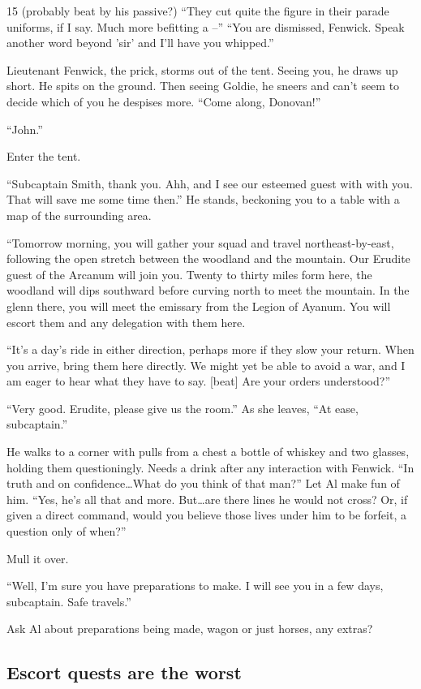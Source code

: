\begin{multicols}{2}
15 (probably beat by his passive?)
``They cut quite the figure in their parade uniforms, if I say.
  Much more befitting a --''
``You are dismissed, Fenwick.
  Speak another word beyond 'sir' and I'll have you whipped.''

Lieutenant Fenwick, the prick, storms out of the tent.
Seeing you, he draws up short.
He spits on the ground.
Then seeing Goldie, he sneers and can't seem to decide which of you he despises more.
``Come along, Donovan!''

``John.''

Enter the tent.

``Subcaptain Smith, thank you.
  Ahh, and I see our esteemed guest with with you.
  That will save me some time then.''
He stands, beckoning you to a table with a map of the surrounding area.

``Tomorrow morning, you will gather your squad and travel northeast-by-east,
    following the open stretch between the woodland and the mountain.
  Our Erudite guest of the Arcanum will join you.
  Twenty to thirty miles form here, the woodland will dips southward before curving north to meet
    the mountain.
  In the glenn there, you will meet the emissary from the Legion of Ayanum.
  You will escort them and any delegation with them here.

``It's a day's ride in either direction, perhaps more if they slow your return.
  When you arrive, bring them here directly.
  We might yet be able to avoid a war, and I am eager to hear what they have to say.
  [beat]
  Are your orders understood?''

``Very good.
  Erudite, please give us the room.''
As she leaves, ``At ease, subcaptain.''

He walks to a corner with pulls from a chest a bottle of whiskey and two glasses, holding them
  questioningly.
Needs a drink after any interaction with Fenwick.
``In truth and on confidence\ldots What do you think of that man?''
Let Al make fun of him.
``Yes, he's all that and more.
  But\ldots are there lines he would not cross?
  Or, if given a direct command, would you believe those lives under him to be forfeit, a question
    only of when?''

Mull it over.

``Well, I'm sure you have preparations to make.
  I will see you in a few days, subcaptain.
  Safe travels.''

Ask Al about preparations being made, wagon or just horses, any extras?

\subsection{Escort quests are the worst}


\end{multicols}
